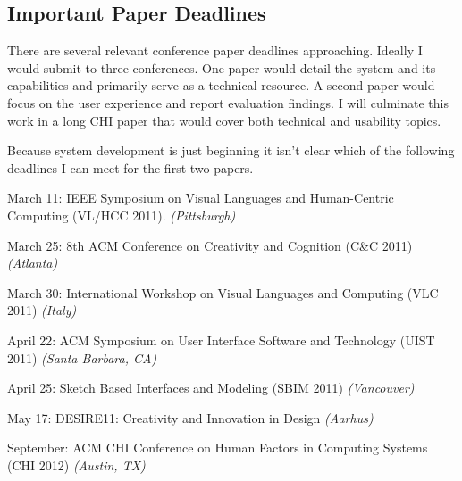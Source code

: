\documentclass[12pt]{article}
\newenvironment{packed_enum}{
\begin{enumerate}
  \setlength{\itemsep}{1pt}
  \setlength{\parskip}{0pt}
  \setlength{\parsep}{0pt}
}{\end{enumerate}}
\begin{document}
\subsection{Important Paper Deadlines}
\label{sec:important-paper-deadlines}

There are several relevant conference paper deadlines
approaching. Ideally I would submit to three conferences. One paper
would detail the system and its capabilities and primarily serve as a
technical resource. A second paper would focus on the user experience
and report evaluation findings. I will culminate this work in a long
CHI paper that would cover both technical and usability topics.

Because system development is just beginning it isn't clear which of
the following deadlines I can meet for the first two papers.

\begin{packed_enum}

\item March 11: IEEE Symposium on Visual Languages and Human-Centric
  Computing (VL/HCC 2011). \textit{(Pittsburgh)}

\item March 25: 8th ACM Conference on Creativity and Cognition (C\&C
  2011) \textit{(Atlanta)}

\item March 30: International Workshop on Visual Languages and
  Computing (VLC 2011) \textit{(Italy)}

\item April 22: ACM Symposium on User Interface Software and
  Technology (UIST 2011) \textit{(Santa Barbara, CA)}

\item April 25: Sketch Based Interfaces and Modeling (SBIM 2011)
  \textit{(Vancouver)}

\item May 17: DESIRE11: Creativity and Innovation in Design
  \textit{(Aarhus)}

\item September: ACM CHI Conference on Human Factors in Computing
  Systems (CHI 2012) \textit{(Austin, TX)}

\end{packed_enum}
\singlespacing\newpage



\end{document}
